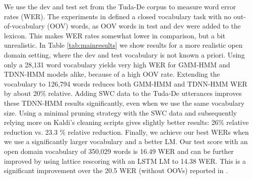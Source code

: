 \documentclass[a4paper]{article}
\begin{document}
We use the dev and test set from the Tuda-De corpus to measure word error rates (WER). The experiments in \cite{radeck2015open} defined a closed vocabulary task with no out-of-vocabulary (OOV) words, as OOV words in test and dev were added to the lexicon. This makes WER rates somewhat lower in comparison, but a bit unrealistic. In Table \ref{tab:mainresults} we show results for a more realistic open domain setting, where the dev and test vocabulary is not known a priori. Using only a 28,131 word vocabulary yields very high WER for GMM-HMM and TDNN-HMM models alike, because of a high OOV rate. Extending the vocabulary to 126,794 words reduces both GMM-HMM and TDNN-HMM WER by about 20\% relative. Adding SWC data to the Tuda-De utterances improves these TDNN-HMM results significantly, even when we use the same vocabulary size. Using a minimal pruning strategy with the SWC data and subsequently relying more on Kaldi's cleaning scripts gives slightly better results: 26\% relative reduction vs. 23.3 \% relative reduction. Finally, we achieve our best WERs when we use a significantly larger vocabulary and a better LM. Our test score with an open domain vocabulary of 350,029 words is 16.49 WER and can be further improved by using lattice rescoring with an LSTM LM to 14.38 WER. This is a significant improvement over the 20.5 WER (without OOVs) reported in \cite{radeck2015open}.
\end{document}
